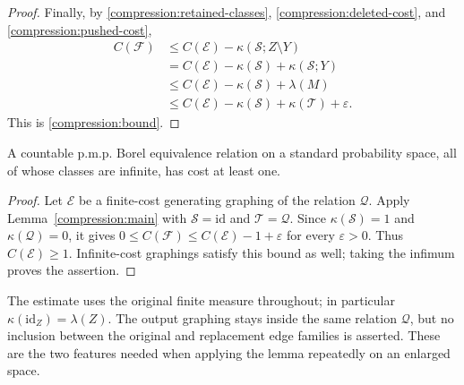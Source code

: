 \begin{proof}
Finally, by \eqref{compression:retained-classes},
\eqref{compression:deleted-cost}, and
\eqref{compression:pushed-cost},
\[
 \begin{aligned}
 C(\mathcal F)
 &\leq C(\mathcal E)-\kappa(\mathcal S;Z\setminus Y)\\
 &=C(\mathcal E)-\kappa(\mathcal S)+\kappa(\mathcal S;Y)\\
 &\leq C(\mathcal E)-\kappa(\mathcal S)+\lambda(M)\\
 &\leq C(\mathcal E)-\kappa(\mathcal S)
                       +\kappa(\mathcal T)+\varepsilon.
 \end{aligned}
\]
This is \eqref{compression:bound}.
\end{proof}

\begin{corollary}\label{compression:cost-one}
A countable p.m.p. Borel equivalence relation on a standard probability
space, all of whose classes are infinite, has cost at least one.
\end{corollary}
\begin{proof}
Let $\mathcal E$ be a finite-cost generating graphing of the relation
$\mathcal Q$. Apply Lemma~\ref{compression:main} with
$\mathcal S=\mathrm{id}$ and $\mathcal T=\mathcal Q$. Since
$\kappa(\mathcal S)=1$ and $\kappa(\mathcal Q)=0$, it gives
$0\le C(\mathcal F)\le C(\mathcal E)-1+\varepsilon$ for every
$\varepsilon>0$. Thus $C(\mathcal E)\ge1$. Infinite-cost graphings
satisfy this bound as well; taking the infimum proves the assertion.
\end{proof}

\begin{remark}\label{compression:normalization}
The estimate uses the original finite measure throughout; in
particular $\kappa(\mathrm{id}_Z)=\lambda(Z)$.  The output graphing
stays inside the same relation $\mathcal Q$, but no inclusion between
the original and replacement edge families is asserted.  These are
the two features needed when applying the lemma repeatedly on an
enlarged space.
\end{remark}
